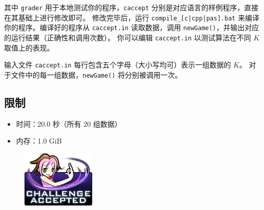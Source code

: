 \documentclass[UTF8, 11pt, a4paper]{article}
\begin{document}
其中 \texttt{grader} 用于本地测试你的程序，\texttt{caccept} %
分别是对应语言的样例程序，直接在其基础上进行修改即可。%
修改完毕后，运行 \texttt{compile\_[c|cpp|pas].bat} 来编译你的程序。编译好的程序从%
\texttt{caccept.in} 读取数据，调用 \texttt{newGame()}，并输出对应的运行结果（正确性和调用次数）。%
你可以编辑 \texttt{caccept.in} 以测试算法在不同 $K$ 取值上的表现。

输入文件 \texttt{caccept.in} 每行包含五个字母（大小写均可）表示一组数据的 $K$。%
对于文件中的每一组数据，\texttt{newGame()} 将分别被调用一次。

\subsection*{限制}
\begin{itemize}
\item 时间：20.0 秒（所有 20 组数据）
\item 内存：1.0 GiB
\end{itemize}

\begin{figure}[h]\centering
\includegraphics[scale=0.55]{challengeaccepted.png}
\end{figure}
\end{document}
